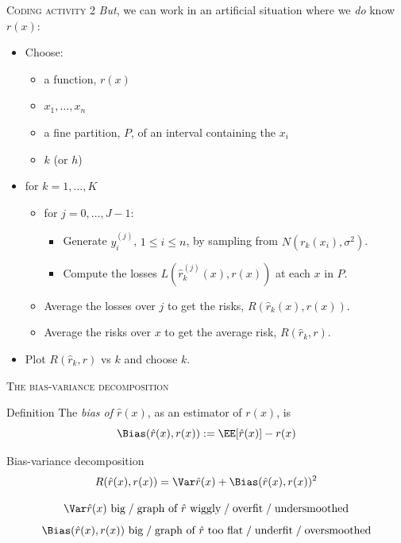 \documentclass{beamer}
\begin{document}
\begin{frame}{\textsc{Coding activity 2}}
    \emph{But}, we can work in an artificial situation where we \emph{do} know $r(x)$:


    \begin{itemize}\setlength{\itemsep}{1ex}
        \item Choose:
        \begin{itemize}
            \item a function, $r(x)$
            \item $x_1,\ldots,x_n$
            \item a fine partition, $P$, of an interval containing the $x_i$
            \item $k$ (or $h$)
        \end{itemize}
            \item for $k=1,\ldots,K$
        \begin{itemize}
        \item for $j=0,\ldots,J-1$:
        \begin{itemize}
            \item Generate $y_i^{(j)}$, $1\leq i\leq n$, by sampling from $N(r_k(x_i), \sigma^2)$.
            \item Compute the losses $L(\hat r^{(j)}_k(x), r(x))$ at each $x$ in $P$.
        \end{itemize}
    \item Average the losses over $j$ to get the risks, $R(\hat r_k(x), r(x))$.
    \item Average the risks over $x$ to get the average risk, $R(\hat r_k, r)$.
    \end{itemize}
    \item Plot $R(\hat r_k, r)$ vs $k$ and choose $k$.
\end{itemize}
\end{frame}

\begin{frame}{\textsc{The bias-variance decomposition}}

    \begin{block}{Definition}
        The \emph{bias of $\hat r(x)$}, as an estimator of $r(x)$, is
        \[
            \Bias(\hat r(x), r(x)) := \EE[\hat r(x)] - r(x)
        \]
    \end{block}

    \begin{block}{Bias-variance decomposition}
        \[
            R(\hat r(x), r(x)) = \Var \hat r(x) + \Bias(\hat r(x), r(x))^2
        \]
    \end{block}

    \[
        \text{$\Var \hat r(x)$ big} \;/\; \text{graph of $\hat r$ wiggly} \;/\; \text{overfit}
        \;/\; \text{undersmoothed}
    \]
    \[
        \text{$\Bias(\hat r(x), r(x))$ big} \;/\; \text{graph of $\hat r$ too flat} \;/\; \text{underfit}
        \;/\; \text{oversmoothed}
    \]
\end{frame}
\end{document}
